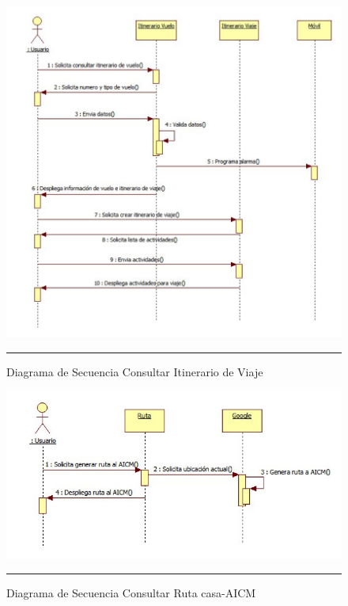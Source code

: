 \begin{figure}[h]
	\centering
		\includegraphics[width=1\textwidth]{Figuras/secConsultarItinerarioViaje.png}
		\rule{30em}{0.5pt}
	\caption[Diagrama de Secuencia Consultar Itinerario de Viaje]{Diagrama de Secuencia Consultar Itinerario de Viaje}
	\label{fig:secConsultarItinerarioViaje}
\end{figure}

\begin{figure}[h]
	\centering
		\includegraphics[width=1\textwidth]{Figuras/secConsultarRutacasa-AICM.png}
		\rule{30em}{0.5pt}
	\caption[Diagrama de Secuencia Consultar Ruta casa-AICM]{Diagrama de Secuencia Consultar Ruta casa-AICM}
	\label{fig:secConsultarRutacasa-AICM}
\end{figure}

